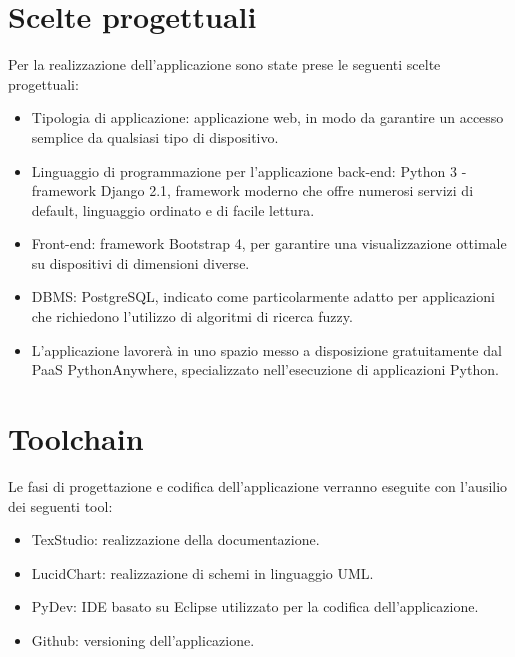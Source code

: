\documentclass[10pt,a4paper]{report}
\begin{document}
	\section{Scelte progettuali}
	Per la realizzazione dell'applicazione sono state prese le seguenti scelte progettuali:
	\begin{itemize}
		\item Tipologia di applicazione: applicazione web, in modo da garantire un accesso semplice da qualsiasi tipo di dispositivo.
		\item Linguaggio di programmazione per l'applicazione back-end: Python 3 - framework Django 2.1, framework moderno che offre numerosi servizi di default, linguaggio ordinato e di facile lettura.
		\item Front-end: framework Bootstrap 4, per garantire una visualizzazione ottimale su dispositivi di dimensioni diverse.
		\item DBMS: PostgreSQL, indicato come particolarmente adatto per applicazioni che richiedono l'utilizzo di algoritmi di ricerca fuzzy.
		\item L'applicazione lavorerà in uno spazio messo a disposizione gratuitamente dal PaaS PythonAnywhere, specializzato nell'esecuzione di applicazioni Python.
	\end{itemize}

	\section{Toolchain}
	Le fasi di progettazione e codifica dell'applicazione verranno eseguite con l'ausilio dei seguenti tool:
	\begin{itemize}
		\item TexStudio: realizzazione della documentazione.
		\item LucidChart: realizzazione di schemi in linguaggio UML.
		\item PyDev: IDE basato su Eclipse utilizzato per la codifica dell'applicazione.
		\item Github: versioning dell'applicazione.
	\end{itemize}
\end{document}
